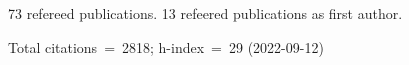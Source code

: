 73 refereed publications. 13 refeered publications as first author.

Total citations~=~2818; h-index~=~29 (2022-09-12)